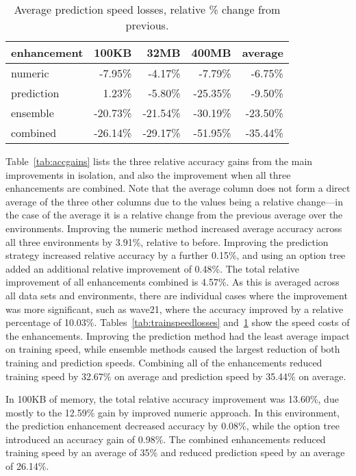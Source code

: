 \begin{table}[!t]
\caption{Average prediction speed losses, relative \% change from previous.}
\label{tab:predspeedlosses}
\centering
\begin{tabular}{|l|r|r|r||r|}
\hline
enhancement	&	100KB	&	32MB	&	400MB	&	average	\\
\hline
numeric	&	-7.95\%	&	-4.17\%	&	-7.79\%	&	-6.75\%	\\
prediction	&	1.23\%	&	-5.80\%	&	-25.35\%	&	-9.50\%	\\
ensemble	&	-20.73\%	&	-21.54\%	&	-30.19\%	&	-23.50\%	\\
\hline
\hline
combined	&	-26.14\%	&	-29.17\%	&	-51.95\%	&	-35.44\%	\\
\hline
\end{tabular}
\end{table}

Table~\ref{tab:accgains} lists the three relative accuracy gains from the main improvements in isolation, and also the improvement when all three enhancements are combined. Note that the average column does not form a direct average of the three other columns due to the values being a relative change---in the case of the average it is a relative change from the previous average over the environments. Improving the numeric method increased average accuracy across all three environments by 3.91\%, relative to before. Improving the prediction strategy increased relative accuracy by a further 0.15\%, and using an option tree added an additional relative improvement of 0.48\%. The total relative improvement of all enhancements combined is 4.57\%. As this is averaged across all data sets and environments, there are individual cases where the improvement was more significant, such as {\sc wave21}, where the accuracy improved by a relative percentage of 10.03\%. Tables~\ref{tab:trainspeedlosses} and~\ref{tab:predspeedlosses} show the speed costs of the enhancements. Improving the prediction method had the least average impact on training speed, while ensemble methods caused the largest reduction of both training and prediction speeds. Combining all of the enhancements reduced training speed by 32.67\% on average and prediction speed by 35.44\% on average.

In 100KB of memory, the total relative accuracy improvement was 13.60\%, due mostly to the 12.59\% gain by improved numeric approach. In this environment, the prediction enhancement decreased accuracy by 0.08\%, while the option tree introduced an accuracy gain of 0.98\%. The combined enhancements reduced training speed by an average of 35\% and reduced prediction speed by an average of 26.14\%.

